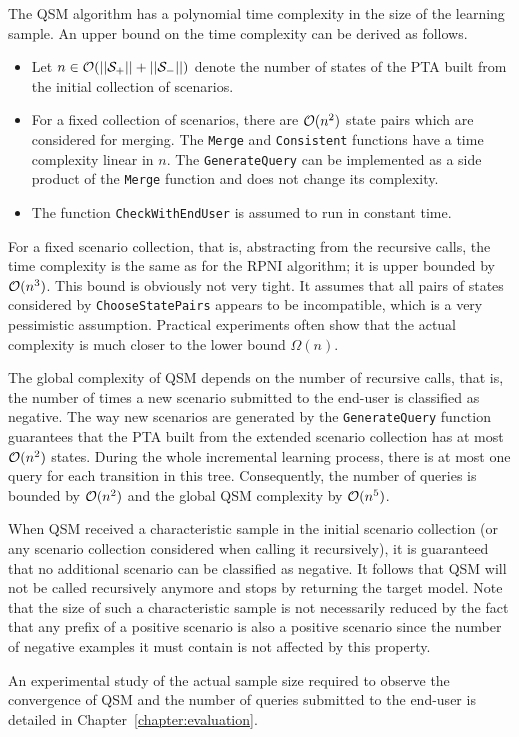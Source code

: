 The QSM algorithm has a polynomial time complexity in the size of the learning sample. An upper bound on the time complexity can be derived as follows.
\begin{itemize}
\item Let $n\in \cal{O}(||S_+||+||S_-||)$ denote the number of states of the PTA built from the initial collection of scenarios. 
\item For a fixed collection of scenarios, there are ${\cal O}(n^2)$ state pairs which are considered for merging.
The \texttt{Merge} and \texttt{Consistent} functions have a time complexity linear in $n$. The \texttt{GenerateQuery} can be implemented as a side product of the \texttt{Merge} function and does not change its complexity.
\item The function \texttt{CheckWithEndUser} is assumed to run in constant time.
\end{itemize}

For a fixed scenario collection, that is, abstracting from the recursive calls, the time complexity is the same as for the RPNI algorithm; it is upper bounded by ${\cal O}(n^3)$. This bound is obviously not very tight. It assumes that all pairs of states considered by \texttt{ChooseStatePairs} appears to be incompatible,  which is a very pessimistic assumption. Practical experiments often show that the actual complexity is much closer to the lower bound $\Omega(n)$. 

The global complexity of QSM depends on the number of recursive calls, that is, the number of times a new scenario
submitted to the end-user is classified as negative. The way new scenarios are generated by the \texttt{GenerateQuery} function guarantees that the PTA built from the extended scenario collection has at most ${\cal O}(n^2)$ states.
During the whole incremental learning process, there is at most one query for each transition in this tree.  Consequently, the number of queries is bounded by ${\cal O}(n^2)$ and the global QSM complexity by ${\cal O}(n^5)$.

When QSM received a characteristic sample in the initial scenario collection (or any scenario collection considered when calling it recursively), it is guaranteed that no additional scenario can be classified as negative.
It follows that QSM will not be called recursively anymore and stops by returning the target model. Note that the size of such a characteristic sample is not necessarily reduced by the fact that any prefix of a positive scenario is also a positive scenario since the number of negative examples it must contain is not affected by this property. 

An experimental study of the actual sample size required to observe the convergence of \textsc{QSM} and the number of queries submitted to the end-user is detailed in Chapter~\ref{chapter:evaluation}.
